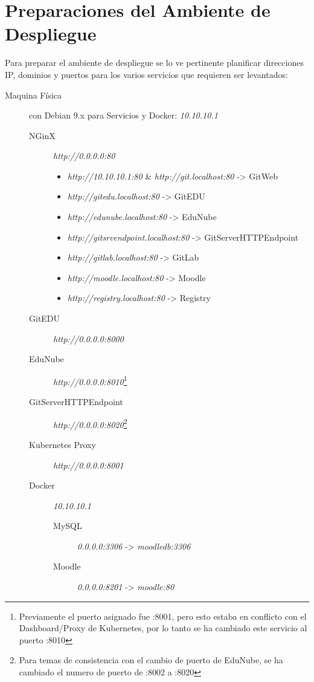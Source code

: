\section{Preparaciones del Ambiente de Despliegue}
Para preparar el ambiente de despliegue se lo ve pertinente planificar direcciones IP, dominios y puertos para los varios servicios que requieren ser levantados:
\begin{description}
	\item[Maquina Física] con Debian 9.x para Servicios y Docker: \textit{10.10.10.1}
    \begin{description}
    	\item[NGinX] \textit{http://0.0.0.0:80} 
        \begin{itemize}
            \item \textit{http://10.10.10.1:80} \& \textit{http://git.localhost:80} -> GitWeb
            \item \textit{http://gitedu.localhost:80} -> GitEDU
            \item \textit{http://edunube.localhost:80} -> EduNube
            \item \textit{http://gitsrvendpoint.localhost:80} -> GitServerHTTPEndpoint
            \item \textit{http://gitlab.localhost:80} -> GitLab
            \item \textit{http://moodle.localhost:80} -> Moodle
            \item \textit{http://registry.localhost:80} -> Registry
        \end{itemize}
        \item[GitEDU] \textit{http://0.0.0.0:8000}
        \item[EduNube] \textit{http://0.0.0.0:8010}\footnote{Previamente el puerto asignado fue :8001, pero esto estaba en conflicto con el Dashboard/Proxy de Kubernetes, por lo tanto se ha cambiado este servicio al puerto :8010}
        \item[GitServerHTTPEndpoint] \textit{http://0.0.0.0:8020}\footnote{Para temas de consistencia con el cambio de puerto de EduNube, se ha cambiado el numero de puerto de :8002 a :8020}
        \item[Kubernetes Proxy] \textit{http://0.0.0.0:8001}
        \item[Docker] \textit{10.10.10.1}
        \begin{description}
        	\item[MySQL] \textit{0.0.0.0:3306} -> \textit{moodledb:3306}
        	\item[Moodle] \textit{0.0.0.0:8201} -> \textit{moodle:80}

\end{description}
\end{description}
\end{description}
